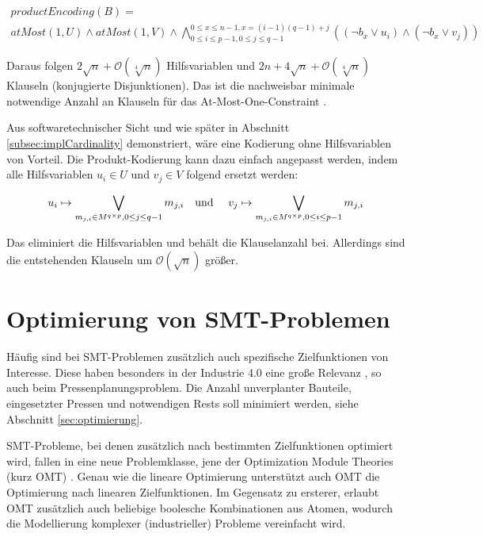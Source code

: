 \begin{multline*}
    productEncoding(B) = \\
    atMost(1,U) \land atMost(1,V) \land \bigwedge_{0 \leq i \leq p-1, 0 \leq j \leq q-1}^{0 \leq x \leq n-1, x = (i-1)(q-1)+j} ((\neg b_x \lor u_i) \land (\neg b_x \lor v_j) )
\end{multline*}

Daraus folgen $2 \sqrt{n} + \mathcal{O}(\sqrt[4]{n})$ Hilfsvariablen und $2n + 4\sqrt{n} + \mathcal{O}(\sqrt[4]{n})$ Klauseln (konjugierte Disjunktionen).
Das ist die nachweisbar minimale notwendige Anzahl an Klauseln für das At-Most-One-Constraint \cite{amoChen, lowerBoundAMO}.


Aus softwaretechnischer Sicht und wie später in Abschnitt \ref{subsec:implCardinality} demonstriert, wäre eine Kodierung ohne Hilfsvariablen von Vorteil.
Die Produkt-Kodierung kann dazu einfach angepasst werden, indem alle Hilfsvariablen $u_i \in U$ und $v_j \in V$ folgend ersetzt werden:

\[
    u_i \mapsto \bigvee_{m_{j,i} \in M^{q \times p}, 0 \leq j \leq q-1} m_{j,i} \text{\quad und \quad}
    v_j \mapsto \bigvee_{m_{j,i} \in M^{q \times p}, 0 \leq i \leq p-1} m_{j,i}
\]

Das eliminiert die Hilfsvariablen und behält die Klauselanzahl bei.
Allerdings sind die entstehenden Klauseln um $\mathcal{O}(\sqrt{n})$ größer.

\section{Optimierung von SMT-Problemen}
Häufig sind bei SMT-Problemen zusätzlich auch spezifische Zielfunktionen von Interesse.
Diese haben besonders in der Industrie 4.0 eine große Relevanz \cite{omt}, so auch beim Pressenplanungsproblem.
Die Anzahl unverplanter Bauteile, eingesetzter Pressen und notwendigen Rests soll minimiert werden, siehe Abschnitt \ref{sec:optimierung}.

SMT-Probleme, bei denen zusätzlich nach bestimmten Zielfunktionen optimiert wird, fallen in eine neue Problemklasse,
jene der Optimization Module Theories (kurz OMT) \cite{omt}.
Genau wie die lineare Optimierung unterstützt auch OMT die Optimierung nach linearen Zielfunktionen.
Im Gegensatz zu ersterer, erlaubt OMT zusätzlich auch beliebige boolesche Kombinationen aus Atomen, wodurch die Modellierung komplexer (industrieller) Probleme vereinfacht wird.

